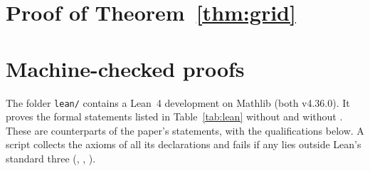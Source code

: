 \documentclass[11pt,a4paper]{article}
\theoremstyle{remark}
\begin{document}
\appendix
\section{Proof of Theorem~\ref{thm:grid}}
\label{app:proof}



\section{Machine-checked proofs}
\label{app:lean}

The folder \nolinkurl{lean/} contains a Lean~4 development on Mathlib (both v4.36.0).
It proves the formal statements listed in Table~\ref{tab:lean} without
 and without . These are counterparts of the
paper's statements, with the qualifications below. A script collects the axioms of all its
declarations and fails if any lies outside Lean's standard three
(, , ).
\end{document}
